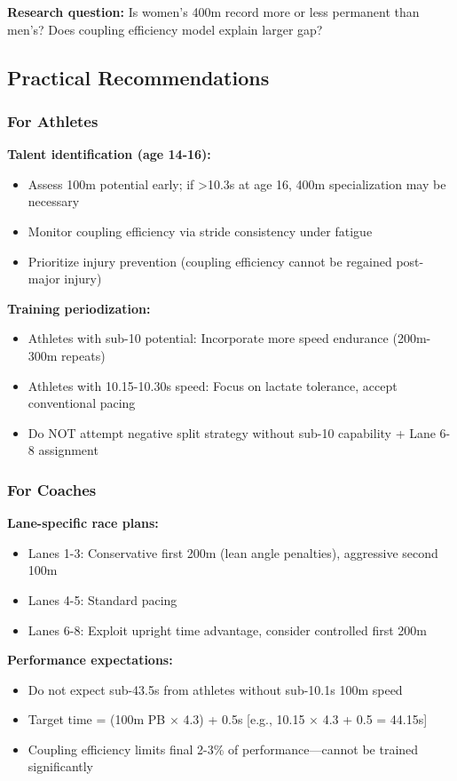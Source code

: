 \textbf{Research question:} Is women's 400m record more or less permanent than men's? Does coupling efficiency model explain larger gap?

\subsection{Practical Recommendations}

\subsubsection{For Athletes}

\textbf{Talent identification (age 14-16):}
\begin{itemize}
    \item Assess 100m potential early; if >10.3s at age 16, 400m specialization may be necessary
    \item Monitor coupling efficiency via stride consistency under fatigue
    \item Prioritize injury prevention (coupling efficiency cannot be regained post-major injury)
\end{itemize}

\textbf{Training periodization:}
\begin{itemize}
    \item Athletes with sub-10 potential: Incorporate more speed endurance (200m-300m repeats)
    \item Athletes with 10.15-10.30s speed: Focus on lactate tolerance, accept conventional pacing
    \item Do NOT attempt negative split strategy without sub-10 capability + Lane 6-8 assignment
\end{itemize}

\subsubsection{For Coaches}

\textbf{Lane-specific race plans:}
\begin{itemize}
    \item Lanes 1-3: Conservative first 200m (lean angle penalties), aggressive second 100m
    \item Lanes 4-5: Standard pacing
    \item Lanes 6-8: Exploit upright time advantage, consider controlled first 200m
\end{itemize}

\textbf{Performance expectations:}
\begin{itemize}
    \item Do not expect sub-43.5s from athletes without sub-10.1s 100m speed
    \item Target time = (100m PB $\times$ 4.3) + 0.5s [e.g., 10.15 $\times$ 4.3 + 0.5 = 44.15s]
    \item Coupling efficiency limits final 2-3\% of performance—cannot be trained significantly
\end{itemize}

